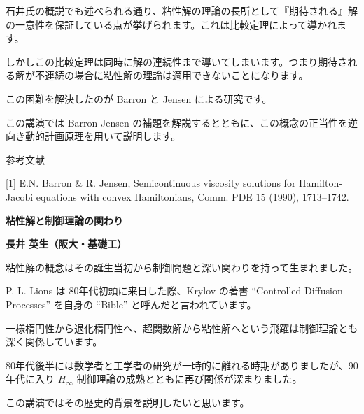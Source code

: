 \documentclass[uplatex,dvipdfmx]{jlreq}
\begin{document}
石井氏の概説でも述べられる通り、粘性解の理論の長所として『期待される』解の一意性を保証している点が挙げられます。これは比較定理によって導かれます。

しかしこの比較定理は同時に解の連続性まで導いてしまいます。つまり期待される解が不連続の場合に粘性解の理論は適用できないことになります。

この困難を解決したのが Barron と Jensen による研究です。

この講演では Barron-Jensen の補題を解説するとともに、この概念の正当性を逆向き動的計画原理を用いて説明します。

\bigskip

参考文献

[1] E.N. Barron \& R. Jensen,  
Semicontinuous viscosity solutions for Hamilton-Jacobi equations with convex Hamiltonians,  
Comm. PDE 15 (1990), 1713--1742.

\newpage


\begin{center}
{\large\bfseries 粘性解と制御理論の関わり}
\end{center}

\begin{flushright}
\textbf{長井 英生（阪大・基礎工）}
\end{flushright}

粘性解の概念はその誕生当初から制御問題と深い関わりを持って生まれました。

P. L. Lions は 80年代初頭に来日した際、Krylov の著書  
``Controlled Diffusion Processes'' を自身の ``Bible'' と呼んだと言われています。

一様楕円性から退化楕円性へ、超関数解から粘性解へという飛躍は制御理論とも深く関係しています。

80年代後半には数学者と工学者の研究が一時的に離れる時期がありましたが、90年代に入り $H_\infty$ 制御理論の成熟とともに再び関係が深まりました。

この講演ではその歴史的背景を説明したいと思います。
\end{document}
